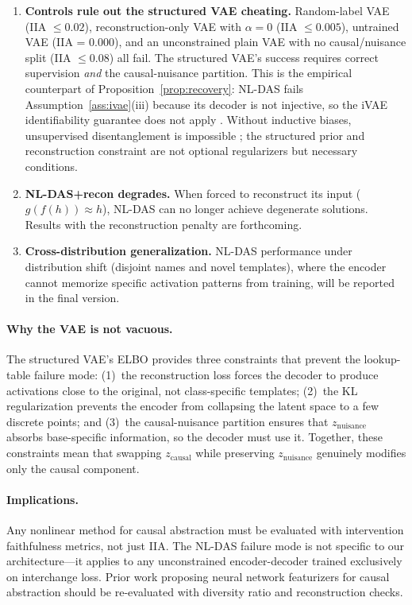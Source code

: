 \documentclass{article}
\begin{document}
\begin{enumerate}[leftmargin=*]
\item \textbf{Controls rule out the structured VAE cheating.} Random-label VAE
  (IIA $\leq 0.02$), reconstruction-only VAE with $\alpha = 0$
  (IIA $\leq 0.005$), untrained VAE (IIA = 0.000), and an unconstrained plain
  VAE with no causal/nuisance split (IIA $\leq 0.08$) all fail. The structured
  VAE's success requires correct supervision \emph{and} the
  causal-nuisance partition. This is the empirical counterpart of Proposition~\ref{prop:recovery}: NL-DAS
  fails Assumption~\ref{ass:ivae}(iii) because its decoder is not injective,
  so the iVAE identifiability guarantee does not apply
  \citep{khemakhem2020variational}. Without inductive biases, unsupervised
  disentanglement is impossible \citep{locatello2019challenging}; the
  structured prior and reconstruction constraint are not optional regularizers
  but necessary conditions.

\item \textbf{NL-DAS+recon degrades.} When forced to reconstruct its input
  ($g(f(h)) \approx h$), NL-DAS can no longer achieve degenerate solutions.
  Results with the reconstruction penalty are forthcoming.

\item \textbf{Cross-distribution generalization.}
  NL-DAS performance under distribution shift (disjoint names and novel
  templates), where the encoder cannot memorize specific activation patterns
  from training, will be reported in the final version.
\end{enumerate}

\paragraph{Why the VAE is not vacuous.}
The structured VAE's ELBO provides three constraints that prevent the
lookup-table failure mode: (1)~the reconstruction loss forces the decoder to
produce activations close to the original, not class-specific templates;
(2)~the KL regularization prevents the encoder from collapsing the latent space
to a few discrete points; and (3)~the causal-nuisance partition ensures that
$z_\text{nuisance}$ absorbs base-specific information, so the decoder must use
it. Together, these constraints mean that swapping $z_\text{causal}$ while
preserving $z_\text{nuisance}$ genuinely modifies only the causal component.

\paragraph{Implications.}
Any nonlinear method for causal abstraction must be evaluated with intervention
faithfulness metrics, not just IIA. The NL-DAS failure mode is not specific to
our architecture---it applies to any unconstrained encoder-decoder trained
exclusively on interchange loss. Prior work proposing neural network featurizers
for causal abstraction \citep{geiger2024causal} should be re-evaluated with
diversity ratio and reconstruction checks.
\end{document}
